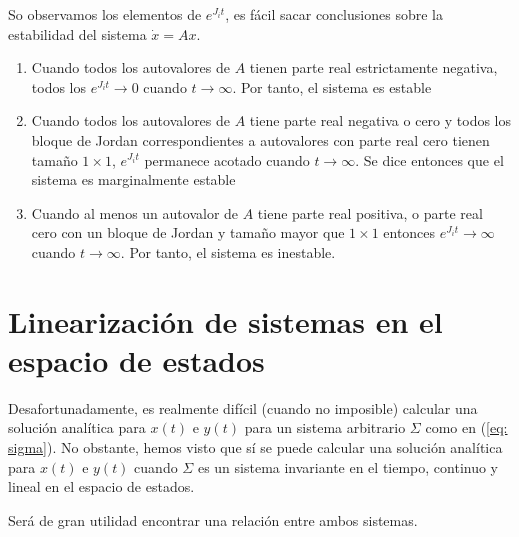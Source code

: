 So observamos los elementos de $e^{J_it}$, es fácil sacar conclusiones sobre la estabilidad del sistema $\dot x = Ax$. 
\begin{enumerate}
\item Cuando todos los autovalores de $A$ tienen parte real estrictamente negativa, todos los $e^{J_it} \rightarrow 0$ cuando $t \rightarrow \infty$. Por tanto, el sistema es estable
\item Cuando todos los autovalores de $A$ tiene parte real negativa o cero y todos los bloque de Jordan correspondientes a autovalores con parte real cero tienen tamaño $1\times 1$, $e^{J_it}$ permanece acotado cuando $t \rightarrow \infty$. Se dice entonces que el sistema es marginalmente estable
\item Cuando al menos un autovalor de $A$ tiene parte real positiva, o parte real cero con un bloque de Jordan y tamaño mayor que $1\times 1$ entonces $e^{J_it} \rightarrow \infty$ cuando $t \rightarrow \infty$. Por tanto, el sistema es inestable.
\end{enumerate}

\section{Linearización de sistemas en el espacio de estados}\label{sec: linear}
Desafortunadamente, es realmente difícil (cuando no imposible) calcular una solución analítica para $x(t)$ e $y(t)$ para un sistema arbitrario $\Sigma$ como en (\ref{eq: sigma}). No obstante, hemos visto que sí se puede calcular una solución analítica para $x(t)$ e $y(t)$ cuando $\Sigma$ es un sistema invariante en el tiempo, continuo y lineal en el espacio de estados.

Será de gran utilidad encontrar una relación entre ambos sistemas.

